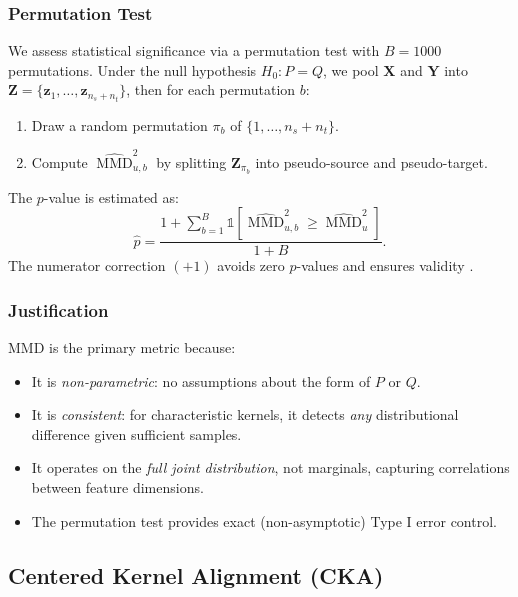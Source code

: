 \documentclass[11pt,a4paper]{article}
\DeclareMathOperator{\MMD}{MMD}
\theoremstyle{definition}
\begin{document}
\subsubsection{Permutation Test}

We assess statistical significance via a permutation test with $B = 1000$ permutations. Under the null hypothesis $H_0: P = Q$, we pool $\bm{X}$ and $\bm{Y}$ into $\bm{Z} = \{\bm{z}_1, \ldots, \bm{z}_{n_s + n_t}\}$, then for each permutation $b$:
\begin{enumerate}[nosep]
  \item Draw a random permutation $\pi_b$ of $\{1, \ldots, n_s + n_t\}$.
  \item Compute $\widehat{\MMD}^2_{u,b}$ by splitting $\bm{Z}_{\pi_b}$ into pseudo-source and pseudo-target.
\end{enumerate}
The $p$-value is estimated as:
\begin{equation}\label{eq:perm-pvalue}
  \hat{p} = \frac{1 + \sum_{b=1}^{B} \mathbb{1}\!\left[\widehat{\MMD}^2_{u,b} \geq \widehat{\MMD}^2_u\right]}{1 + B}.
\end{equation}
The numerator correction $(+1)$ avoids zero $p$-values and ensures validity \cite{phipson2010}.

\subsubsection{Justification}

MMD is the primary metric because:
\begin{itemize}[nosep]
  \item It is \emph{non-parametric}: no assumptions about the form of $P$ or $Q$.
  \item It is \emph{consistent}: for characteristic kernels, it detects \emph{any} distributional difference given sufficient samples.
  \item It operates on the \emph{full joint distribution}, not marginals, capturing correlations between feature dimensions.
  \item The permutation test provides exact (non-asymptotic) Type I error control.
\end{itemize}


\subsection{Centered Kernel Alignment (CKA)}\label{sec:cka}
\end{document}
